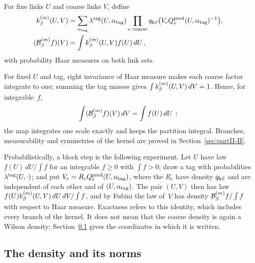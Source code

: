 \begin{definition}\label{def:D04}
For fine links $U$ and coarse links $V$, define
\begin{align*}
k^{(m)}_\beta(U,V)
&=\sum_{\alpha_{\rm tag}}\lambda^{\rm tag}(U,\alpha_{\rm tag})
\prod_{e\ {\rm coarse}}q_{\mathsf{b}\beta}\bigl(V_eQ_e^{\rm pred}(U,\alpha_{\rm tag})^{-1}\bigr),\\
(\mathcal{B}^{(m)}_\beta f)(V)&=\int k^{(m)}_\beta(U,V)f(U)\,dU\,,
\end{align*}
with probability Haar measures on both link sets.
\end{definition}

For fixed $U$ and tag, right invariance of Haar measure makes each coarse factor integrate to one; summing the tag masses gives $\int k^{(m)}_\beta(U,V)\,dV=1$. Hence, for integrable~$f$,
\begin{equation}\label{eq:I12-partition-preservation}
\int(\mathcal{B}^{(m)}_\beta f)(V)\,dV=\int f(U)\,dU\,:
\end{equation}
the map integrates one scale exactly and keeps the partition integral. Branches, measurability and symmetries of the kernel are proved in Section~\ref{sec:partII-B}.

Probabilistically, a block step is the following experiment. Let $U$ have law $f(U)\,dU/\int f$ for an integrable $f\ge0$ with $\int f>0$; draw a tag with probabilities $\lambda^{\rm tag}(U,\cdot)$; and put $V_e=R_eQ_e^{\rm pred}(U,\alpha_{\rm tag})$, where the $R_e$ have density $q_{\mathsf{b}\beta}$ and are independent of each other and of $(U,\alpha_{\rm tag})$. The pair $(U,V)$ then has law $f(U)k^{(m)}_\beta(U,V)\,dU\,dV/\int f$, and by Fubini the law of~$V$ has density $\mathcal{B}^{(m)}_\beta f/\int f$ with respect to Haar measure. Exactness refers to this identity, which includes every branch of the kernel. It does not mean that the coarse density is again a Wilson density; Section~\ref{sec:density} gives the coordinates in which it is written.

\subsection{The density and its norms}\label{sec:density}

